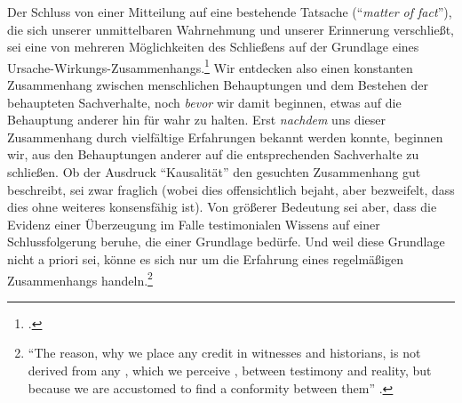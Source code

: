 Der Schluss von einer Mitteilung auf eine bestehende Tatsache (\enquote{\emph{matter
of fact}}), die sich unserer unmittelbaren Wahrnehmung und unserer Erinnerung
verschließt, sei eine von mehreren Möglichkeiten des Schließens auf der
Grundlage eines
Ursache-Wirkungs-Zusammenhangs.\footnote{\cite[Vgl.][23--24]{Hume:AnEnquiryConcerningHumanUnderstanding1964}.}
Wir entdecken also einen konstanten Zusammenhang zwischen menschlichen
Behauptungen und dem Bestehen der behaupteten Sachverhalte, noch \emph{bevor}
wir damit beginnen, etwas auf die Behauptung anderer hin für wahr zu halten.
Erst \emph{nachdem} uns dieser Zusammenhang durch vielfältige Erfahrungen
bekannt werden konnte, beginnen wir, aus den Behauptungen anderer auf die
entsprechenden Sachverhalte zu schließen. Ob der Ausdruck \enquote{Kausalität}
den gesuchten Zusammenhang gut beschreibt, sei zwar fraglich (wobei 
dies offensichtlich bejaht, aber bezweifelt, dass dies ohne weiteres
konsensfähig ist). Von größerer Bedeutung sei aber, dass die Evidenz einer
Überzeugung im Falle testimonialen Wissens auf einer Schlussfolgerung beruhe, die einer
Grundlage bedürfe. Und weil diese Grundlage nicht a priori sei, könne es sich
nur um die Erfahrung eines regelmäßigen Zusammenhangs
handeln.\footnote{\enquote{The reason, why we place any credit in witnesses and historians, is
not derived from any , which we perceive ,
between testimony and reality, but because we are accustomed to find a
conformity between them} \parencite[][\pno~91f.]{Hume:AnEnquiryConcerningHumanUnderstanding1964}.}

